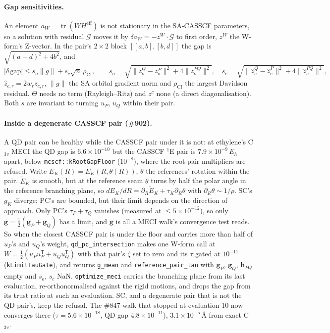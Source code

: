 \documentclass[11pt]{article}
\newcommand{\code}[1]{\texttt{#1}}
\newcommand{\Heff}{H^{\mathrm{eff}}}
\newcommand{\T}{\mathsf T}
\newcommand{\tr}{\operatorname{tr}}
\begin{document}
\paragraph{Gap sensitivities.} An element $a_W = \tr(W\Heff)$ is not
stationary in the SA-CASSCF parameters, so a solution with residual
$\mathcal G$ moves it by $\delta a_W = -z^W\cdot\mathcal G$ to first order,
$z^W$ the W-form's Z-vector. In the pair's $2\times2$ block $[[a, b], [b, d]]$
the gap is $\sqrt{(a-d)^2 + 4b^2}$, and
\begin{equation}
  |\delta\,\mathrm{gap}| \le s_o\|g\| + s_c\sqrt{n}\,\rho_{\mathrm{CI}},\qquad
  s_o = \sqrt{\|z_o^Q - z_o^P\|^2 + 4\|z_o^{PQ}\|^2},\quad
  s_c = \sqrt{\|\hat z_c^Q - \hat z_c^P\|^2 + 4\|\hat z_c^{PQ}\|^2},
\end{equation}
$\hat z_{c,r} = 2w_r z_{c,r}$, $\|g\|$ the SA orbital gradient norm and
$\rho_{\mathrm{CI}}$ the largest Davidson residual. $\Theta$ needs no term
(Rayleigh--Ritz) and $z^c$ none (a direct diagonalisation). Both $s$ are
invariant to turning $u_P$, $u_Q$ within their pair.

\paragraph{Inside a degenerate CASSCF pair (\#902).} A QD pair can be healthy
while the CASSCF pair under it is not: at ethylene's C$_{3v}$ MECI the QD gap
is $6.6\times10^{-10}$ but the CASSCF $^1$E pair is $7.9\times10^{-9}\,E_h$
apart, below \code{mcscf::kRootGapFloor} ($10^{-8}$), where the root-pair
multipliers are refused. Write $E_K(R) = \tilde E_K(R, \theta(R))$, $\theta$
the references' rotation within the pair. $\tilde E_K$ is smooth, but at
the reference seam $\theta$ turns by half the polar angle in the reference
branching plane, so $dE_K/dR = \partial_R\tilde E_K + \tau_K\partial_R\theta$ with
$\partial_R\theta \sim 1/\rho$. SC's $g_K$ diverge; PC's are bounded, but
their limit depends on the direction of approach. Only PC's
$\tau_P + \tau_Q$ vanishes (measured at $\le 5\times10^{-12}$), so only
$\bar{\mathbf g} = \tfrac12(\mathbf g_P + \mathbf g_Q)$ has a limit, and
$\bar{\mathbf g}$ is all a MECI walk's convergence test reads. So when the
closest CASSCF pair is under the floor and carries more than half of
$u_P$'s and $u_Q$'s weight, \code{qd\_pc\_intersection} makes one W-form
call at $W = \tfrac12(u_Pu_P^\T + u_Qu_Q^\T)$ with that pair's $\zeta$ set to
zero and its $\tau$ gated at $10^{-11}$ (\code{kLimitTauGate}), and returns
\code{g\_mean} and \code{reference\_pair\_tau} with $\mathbf g_P$,
$\mathbf g_Q$, $\mathbf h_{PQ}$ empty and $s_o$, $s_c$ NaN.
\code{optimize\_meci} carries the branching plane from its last evaluation,
re-orthonormalised against the rigid motions, and drops the gap from its
trust ratio at such an evaluation. SC, and a degenerate pair that is not the
QD pair's, keep the refusal. The \#847 walk that stopped at evaluation 10
now converges there ($\tau = 5.6\times10^{-18}$, QD gap
$4.8\times10^{-11}$), $3.1\times10^{-5}$\,\AA{} from exact C$_{3v}$.
\end{document}
